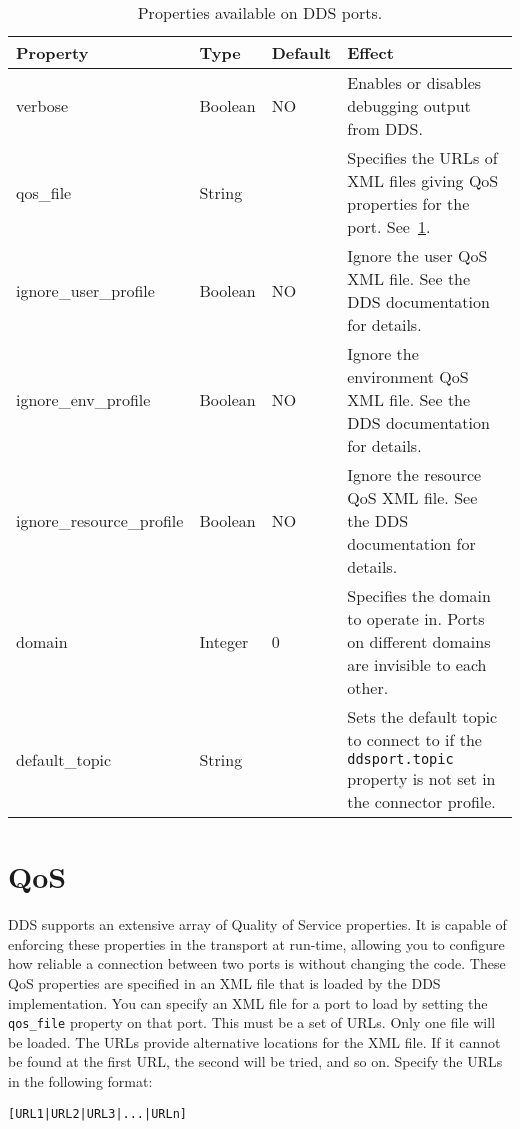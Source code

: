 \documentclass[a4paper,10pt]{article}
\newcommand{\ilcode}[1]{\lstinline|#1|}
\begin{document}
\begin{table}[t]
  \centering
  \begin{tabularx}{\columnwidth}{lllX}
    \toprule
    Property & Type & Default & Effect \\
    \midrule
    verbose & Boolean & NO & Enables or disables debugging output from DDS.  \\
    qos\_file & String & & Specifies the URLs of XML files giving QoS properties for the port. See~\ref{sec:qos}. \\
    ignore\_user\_profile & Boolean & NO & Ignore the user QoS XML file. See the DDS documentation for details. \\
    ignore\_env\_profile & Boolean & NO & Ignore the environment QoS XML file. See the DDS documentation for details. \\
    ignore\_resource\_profile & Boolean & NO & Ignore the resource QoS XML file. See the DDS documentation for details. \\
    domain & Integer & 0 & Specifies the domain to operate in. Ports on different domains are invisible to each other. \\
    default\_topic & String & & Sets the default topic to connect to if the \ilcode{ddsport.topic} property is not set in the connector profile. \\
    \bottomrule
  \end{tabularx}
  \caption{Properties available on DDS ports.}
  \label{tab:props}
\end{table}

\section{QoS}
\label{sec:qos}

DDS supports an extensive array of Quality of Service properties. It is
capable of enforcing these properties in the transport at run-time,
allowing you to configure how reliable a connection between two ports is
without changing the code. These QoS properties are specified in an XML
file that is loaded by the DDS implementation. You can specify an XML
file for a port to load by setting the \ilcode{qos_file} property on that
port. This must be a set of URLs. Only one file will be loaded. The URLs
provide alternative locations for the XML file. If it cannot be found at
the first URL, the second will be tried, and so on. Specify the URLs in
the following format:

\verb+[URL1|URL2|URL3|...|URLn]+
\end{document}

